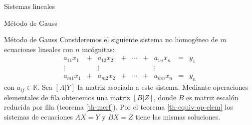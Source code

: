\documentclass[a4paper,12pt,twoside,spanish,reqno]{amsbook}
\numberwithin{equation}{section}
\theoremstyle{definition}
\theoremstyle{remark}
\newcommand{\K}{\mathbb K}
\begin{document}
\begin{chapter}{Sistemas lineales}
\begin{section}{Método de Gauss }
            
            \begin{subsection}{Método de Gauss} Consideremos el siguiente sistema no homogéneo de $m$ ecuaciones lineales con $n$ incógnitas:
                \begin{equation*}
                \begin{matrix}
                a_{11}x_1& + &a_{12}x_2& + &\cdots& + &a_{1n}x_n &= &y_1\\
                \vdots&  &\vdots& &&  &\vdots \\
                a_{m1}x_1& + &a_{m2}x_2& + &\cdots& + &a_{mn}x_n &=&y_n
                \end{matrix}
                \end{equation*}
                con $a_{ij} \in \K$. Sea $[A | Y]$ la matriz asociada a este sistema. Mediante operaciones elementales de fila obtenemos una matriz $[B|Z]$, donde $B$ es matriz escalón reducida por fila (teorema \ref{th-merf}). Por el teorema \ref{th-equiv-op-elem} los sistemas de ecuaciones $AX=Y$ y $BX=Z$ tiene las mismas soluciones. 
                

\end{subsection}
\end{section}
\end{chapter}
\end{document}

